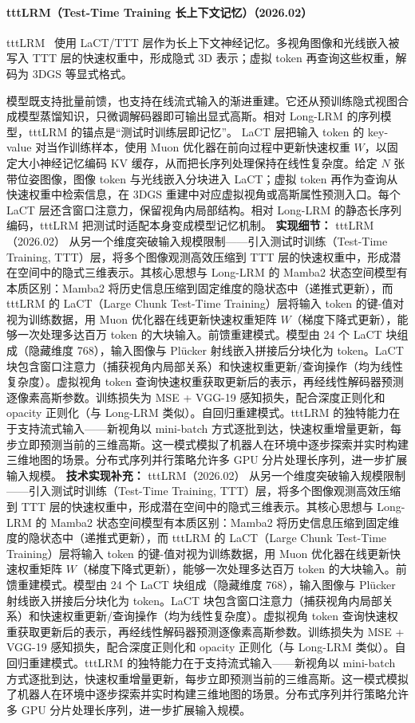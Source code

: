 \paragraph{tttLRM（Test-Time Training 长上下文记忆）（2026.02）}
tttLRM~\cite{2602_20160} 使用 LaCT/TTT 层作为长上下文神经记忆。多视角图像和光线嵌入被写入 TTT 层的快速权重中，形成隐式 3D 表示；虚拟 token 再查询这些权重，解码为 3DGS 等显式格式。

模型既支持批量前馈，也支持在线流式输入的渐进重建。它还从预训练隐式视图合成模型蒸馏知识，只微调解码器即可输出显式高斯。相对 Long-LRM 的序列模型，tttLRM 的锚点是“测试时训练层即记忆”。
LaCT 层把输入 token 的 key-value 对当作训练样本，使用 Muon 优化器在前向过程中更新快速权重 $W$，以固定大小神经记忆编码 KV 缓存，从而把长序列处理保持在线性复杂度。给定 $N$ 张带位姿图像，图像 token 与光线嵌入分块进入 LaCT；虚拟 token 再作为查询从快速权重中检索信息，在 3DGS 重建中对应虚拟视角或高斯属性预测入口。每个 LaCT 层还含窗口注意力，保留视角内局部结构。相对 Long-LRM 的静态长序列编码，tttLRM 把测试时适配本身变成模型记忆机制。
\textbf{实现细节：} tttLRM（2026.02） 从另一个维度突破输入规模限制——引入测试时训练（Test-Time Training, TTT）层，将多个图像观测高效压缩到 TTT 层的快速权重中，形成潜在空间中的隐式三维表示。其核心思想与 Long-LRM 的 Mamba2 状态空间模型有本质区别：Mamba2 将历史信息压缩到固定维度的隐状态中（递推式更新），而 tttLRM 的 LaCT（Large Chunk Test-Time Training）层将输入 token 的键-值对视为训练数据，用 Muon 优化器在线更新快速权重矩阵 $W$（梯度下降式更新），能够一次处理多达百万 token 的大块输入。前馈重建模式。模型由 24 个 LaCT 块组成（隐藏维度 768），输入图像与 Pl\"ucker 射线嵌入拼接后分块化为 token。LaCT 块包含窗口注意力（捕获视角内局部关系）和快速权重更新/查询操作（均为线性复杂度）。虚拟视角 token 查询快速权重获取更新后的表示，再经线性解码器预测逐像素高斯参数。训练损失为 MSE + VGG-19 感知损失，配合深度正则化和 opacity 正则化（与 Long-LRM 类似）。自回归重建模式。tttLRM 的独特能力在于支持流式输入——新视角以 mini-batch 方式逐批到达，快速权重增量更新，每步立即预测当前的三维高斯。这一模式模拟了机器人在环境中逐步探索并实时构建三维地图的场景。分布式序列并行策略允许多 GPU 分片处理长序列，进一步扩展输入规模。
\textbf{技术实现补充：} tttLRM（2026.02） 从另一个维度突破输入规模限制——引入测试时训练（Test-Time Training, TTT）层，将多个图像观测高效压缩到 TTT 层的快速权重中，形成潜在空间中的隐式三维表示。其核心思想与 Long-LRM 的 Mamba2 状态空间模型有本质区别：Mamba2 将历史信息压缩到固定维度的隐状态中（递推式更新），而 tttLRM 的 LaCT（Large Chunk Test-Time Training）层将输入 token 的键-值对视为训练数据，用 Muon 优化器在线更新快速权重矩阵 $W$（梯度下降式更新），能够一次处理多达百万 token 的大块输入。前馈重建模式。模型由 24 个 LaCT 块组成（隐藏维度 768），输入图像与 Pl\"ucker 射线嵌入拼接后分块化为 token。LaCT 块包含窗口注意力（捕获视角内局部关系）和快速权重更新/查询操作（均为线性复杂度）。虚拟视角 token 查询快速权重获取更新后的表示，再经线性解码器预测逐像素高斯参数。训练损失为 MSE + VGG-19 感知损失，配合深度正则化和 opacity 正则化（与 Long-LRM 类似）。自回归重建模式。tttLRM 的独特能力在于支持流式输入——新视角以 mini-batch 方式逐批到达，快速权重增量更新，每步立即预测当前的三维高斯。这一模式模拟了机器人在环境中逐步探索并实时构建三维地图的场景。分布式序列并行策略允许多 GPU 分片处理长序列，进一步扩展输入规模。
